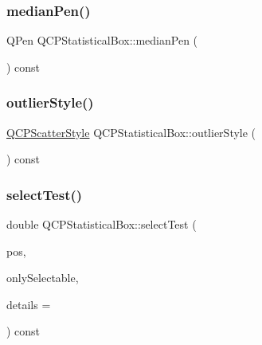 \mbox{\label{class_q_c_p_statistical_box_af767bc7b6b477d005535314b35aca683}} 
\subsubsection{\texorpdfstring{medianPen()}{medianPen()}}
{\footnotesize\ttfamily Q\+Pen Q\+C\+P\+Statistical\+Box\+::median\+Pen (\begin{DoxyParamCaption}{ }\end{DoxyParamCaption}) const\hspace{0.3cm}{\ttfamily [inline]}}

\mbox{\label{class_q_c_p_statistical_box_aef92e38fcb8e5041a44c2e01886e3b66}} 
\subsubsection{\texorpdfstring{outlierStyle()}{outlierStyle()}}
{\footnotesize\ttfamily \mbox{\hyperlink{class_q_c_p_scatter_style}{Q\+C\+P\+Scatter\+Style}} Q\+C\+P\+Statistical\+Box\+::outlier\+Style (\begin{DoxyParamCaption}{ }\end{DoxyParamCaption}) const\hspace{0.3cm}{\ttfamily [inline]}}

\mbox{\label{class_q_c_p_statistical_box_a1607fa92f829c631107c20ccb2d70a6d}} 
\subsubsection{\texorpdfstring{selectTest()}{selectTest()}}
{\footnotesize\ttfamily double Q\+C\+P\+Statistical\+Box\+::select\+Test (\begin{DoxyParamCaption}\item[{const Q\+PointF \&}]{pos,  }\item[{bool}]{only\+Selectable,  }\item[{Q\+Variant $\ast$}]{details = {} }\end{DoxyParamCaption}) const\hspace{0.3cm}{\ttfamily [virtual]}}

